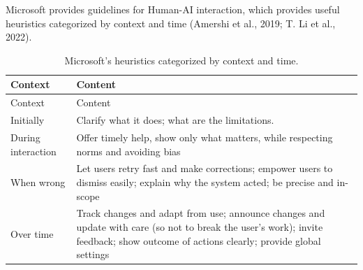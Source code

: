 \documentclass[
  letterpaper,
  DIV=11,
  numbers=noendperiod]{scrartcl}
\begin{document}
Microsoft provides guidelines for Human-AI interaction, which provides
useful heuristics categorized by context and time (Amershi et al., 2019;
T. Li et al., 2022).

\begin{longtable}[]{@{}
  >{\raggedright\arraybackslash}p{}
  >{\raggedright\arraybackslash}p{}@{}}
\caption{Microsoft's heuristics categorized by context and
time.}\tabularnewline
\toprule\noalign{}
\begin{minipage}[b]{\linewidth}\raggedright
Context
\end{minipage} & \begin{minipage}[b]{\linewidth}\raggedright
Content
\end{minipage} \\
\midrule\noalign{}
\endfirsthead
\toprule\noalign{}
\begin{minipage}[b]{\linewidth}\raggedright
Context
\end{minipage} & \begin{minipage}[b]{\linewidth}\raggedright
Content
\end{minipage} \\
\midrule\noalign{}
\endhead
\bottomrule\noalign{}
\endlastfoot
Initially & Clarify what it does; what are the limitations. \\
During interaction & Offer timely help, show only what matters, while
respecting norms and avoiding bias \\
When wrong & Let users retry fast and make corrections; empower users to
dismiss easily; explain why the system acted; be precise and in-scope \\
Over time & Track changes and adapt from use; announce changes and
update with care (so not to break the user's work); invite feedback;
show outcome of actions clearly; provide global settings \\
\end{longtable}
\end{document}
